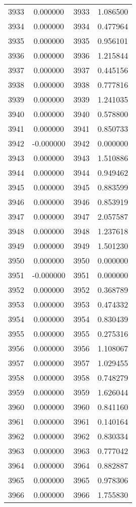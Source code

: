 \documentclass[12pt]{article}
\begin{document}
\begin{longtable}{@{}cccc@{}}
3933 & 0.000000 & 3933 & 1.086500 \\
3934 & 0.000000 & 3934 & 0.477964 \\
3935 & 0.000000 & 3935 & 0.956101 \\
3936 & 0.000000 & 3936 & 1.215844 \\
3937 & 0.000000 & 3937 & 0.445156 \\
3938 & 0.000000 & 3938 & 0.777816 \\
3939 & 0.000000 & 3939 & 1.241035 \\
3940 & 0.000000 & 3940 & 0.578800 \\
3941 & 0.000000 & 3941 & 0.850733 \\
3942 & -0.000000 & 3942 & 0.000000 \\
3943 & 0.000000 & 3943 & 1.510886 \\
3944 & 0.000000 & 3944 & 0.949462 \\
3945 & 0.000000 & 3945 & 0.883599 \\
3946 & 0.000000 & 3946 & 0.853919 \\
3947 & 0.000000 & 3947 & 2.057587 \\
3948 & 0.000000 & 3948 & 1.237618 \\
3949 & 0.000000 & 3949 & 1.501230 \\
3950 & 0.000000 & 3950 & 0.000000 \\
3951 & -0.000000 & 3951 & 0.000000 \\
3952 & 0.000000 & 3952 & 0.368789 \\
3953 & 0.000000 & 3953 & 0.474332 \\
3954 & 0.000000 & 3954 & 0.830439 \\
3955 & 0.000000 & 3955 & 0.275316 \\
3956 & 0.000000 & 3956 & 1.108067 \\
3957 & 0.000000 & 3957 & 1.029455 \\
3958 & 0.000000 & 3958 & 0.748279 \\
3959 & 0.000000 & 3959 & 1.626044 \\
3960 & 0.000000 & 3960 & 0.841160 \\
3961 & 0.000000 & 3961 & 0.140164 \\
3962 & 0.000000 & 3962 & 0.830334 \\
3963 & 0.000000 & 3963 & 0.777042 \\
3964 & 0.000000 & 3964 & 0.882887 \\
3965 & 0.000000 & 3965 & 0.978306 \\
3966 & 0.000000 & 3966 & 1.755830 \\

\end{longtable}
\end{document}

